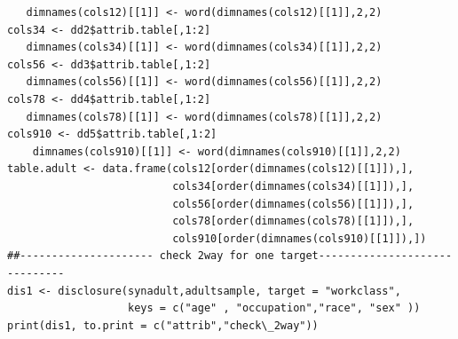 \documentclass[12pt]{article}
\renewcommand{\baselinestretch}{1.5} %
\begin{document}
\begin{verbatim}
   dimnames(cols12)[[1]] <- word(dimnames(cols12)[[1]],2,2)
cols34 <- dd2$attrib.table[,1:2]
   dimnames(cols34)[[1]] <- word(dimnames(cols34)[[1]],2,2)
cols56 <- dd3$attrib.table[,1:2]
   dimnames(cols56)[[1]] <- word(dimnames(cols56)[[1]],2,2)
cols78 <- dd4$attrib.table[,1:2]
   dimnames(cols78)[[1]] <- word(dimnames(cols78)[[1]],2,2)
cols910 <- dd5$attrib.table[,1:2]
    dimnames(cols910)[[1]] <- word(dimnames(cols910)[[1]],2,2)
table.adult <- data.frame(cols12[order(dimnames(cols12)[[1]]),],
                          cols34[order(dimnames(cols34)[[1]]),],
                          cols56[order(dimnames(cols56)[[1]]),],
                          cols78[order(dimnames(cols78)[[1]]),],
                          cols910[order(dimnames(cols910)[[1]]),])
##--------------------- check 2way for one target------------------------------
dis1 <- disclosure(synadult,adultsample, target = "workclass",
                   keys = c("age" , "occupation","race", "sex" ))
print(dis1, to.print = c("attrib","check\_2way"))
\end{verbatim}
\renewcommand{\baselinestretch}{1.5}
\end{document}
